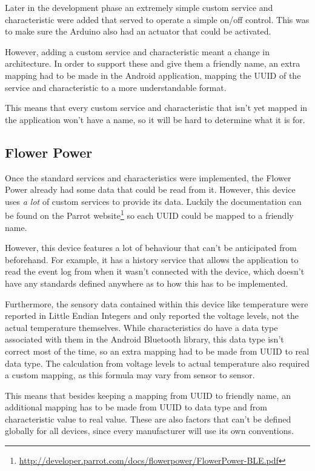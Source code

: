 \documentclass[pdftex,a4paper,12pt,twoside]{report}
\begin{document}
Later in the development phase an extremely simple custom service and characteristic were added that served to operate a simple on/off control. This was to make sure the Arduino also had an actuator that could be activated.

However, adding a custom service and characteristic meant a change in architecture. In order to support these and give them a friendly name, an extra mapping had to be made in the Android application, mapping the UUID of the service and characteristic to a more understandable format.

This means that every custom service and characteristic that isn't yet mapped in the application won't have a name, so it will be hard to determine what it is for.

\subsection{Flower Power}
\label{subsec:achievementsflowerpower}
Once the standard services and characteristics were implemented, the Flower Power already had some data that could be read from it. However, this device uses \textit{a lot} of custom services to provide its data. Luckily the documentation can be found on the Parrot website\footnote{\url{http://developer.parrot.com/docs/flowerpower/FlowerPower-BLE.pdf}} so each UUID could be mapped to a friendly name.

However, this device features a lot of behaviour that can't be anticipated from beforehand. For example, it has a history service that allows the application to read the event log from when it wasn't connected with the device, which doesn't have any standards defined anywhere as to how this has to be implemented.

Furthermore, the sensory data contained within this device like temperature were reported in Little Endian Integers and only reported the voltage levels, not the actual temperature themselves. While characteristics do have a data type associated with them in the Android Bluetooth library, this data type isn't correct most of the time, so an extra mapping had to be made from UUID to real data type. The calculation from voltage levels to actual temperature also required a custom mapping, as this formula may vary from sensor to sensor.

This means that besides keeping a mapping from UUID to friendly name, an additional mapping has to be made from UUID to data type and from characteristic value to real value. These are also factors that can't be defined globally for all devices, since every manufacturer will use its own conventions.
\end{document}
